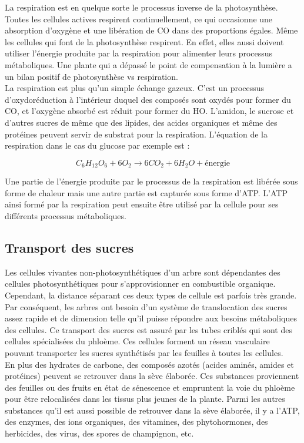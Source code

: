 La respiration est en quelque sorte le processus inverse de la photosynthèse. Toutes les cellules actives respirent continuellement, ce qui occasionne une absorption d'oxygène et une libération de CO dans des proportions égales. Même les cellules qui font de la photosynthèse respirent. En effet, elles aussi doivent utiliser l'énergie produite par la respiration pour alimenter leurs processus métaboliques. Une plante qui a dépassé le point de compensation à la lumière a un bilan positif de photosynthèse vs respiration.\\

La respiration est plus qu'un simple échange gazeux. C'est un processus d'oxydoréduction à l'intérieur duquel des composés sont oxydés pour former du CO, et l'oxygène absorbé est réduit pour former du HO. L'amidon, le sucrose et d'autres sucres de même que des lipides, des acides organiques et même des protéines peuvent servir de substrat pour la respiration. L'équation de la respiration dans le cas du glucose par exemple est : 

\[ C_6H_{12}O_6 + 6O_2  \longrightarrow  6CO_2 + 6H_2O + \mbox{énergie} \]

Une partie de l'énergie produite par le processus de la respiration est libérée sous forme de chaleur mais une autre partie est capturée sous forme d'ATP. L'ATP ainsi formé par la respiration peut ensuite être utilisé par la cellule pour ses différents processus métaboliques. 

\subsection{Transport des sucres} 
 
Les cellules vivantes non-photosynthétiques d'un arbre sont dépendantes des cellules photosynthétiques pour s'approvisionner en combustible organique. Cependant, la distance séparant ces deux types de cellule est parfois très grande. Par conséquent, les arbres ont besoin d'un système de translocation des sucres assez rapide et de dimension telle qu'il puisse répondre aux besoins métaboliques des cellules. Ce transport des sucres est assuré par les tubes criblés qui sont des cellules spécialisées du phloème. Ces cellules forment un réseau vasculaire pouvant transporter les sucres synthétisés par les feuilles à toutes les cellules.\\

En plus des hydrates de carbone, des composés azotés (acides aminés, amides et protéines) peuvent se retrouver dans la sève élaborée. Ces substances proviennent des feuilles ou des fruits en état de sénescence et empruntent la voie du phloème pour être relocalisées dans les tissus plus jeunes de la plante. Parmi les autres substances qu'il est aussi possible de retrouver dans la sève élaborée, il y a l'ATP, des enzymes, des ions organiques, des vitamines, des phytohormones, des herbicides, des virus, des spores de champignon, etc.\\

